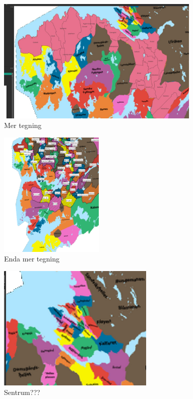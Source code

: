 \begin{frame}
    \begin{figure}
        \centering
        \includegraphics[height = 6cm]{images/qgis3.jpg}%
        \caption{Mer tegning}
    \end{figure}
\end{frame}

\begin{frame}
    \begin{figure}
        \centering
        \includegraphics[height = 6cm]{images/qgis4.png}%
        \caption{Enda mer tegning}
    \end{figure}
\end{frame}

\begin{frame}
    \begin{figure}
        \centering
        \includegraphics[height = 6cm]{images/qgis5.png}%
        \caption{Sentrum???}
    \end{figure}
\end{frame}

